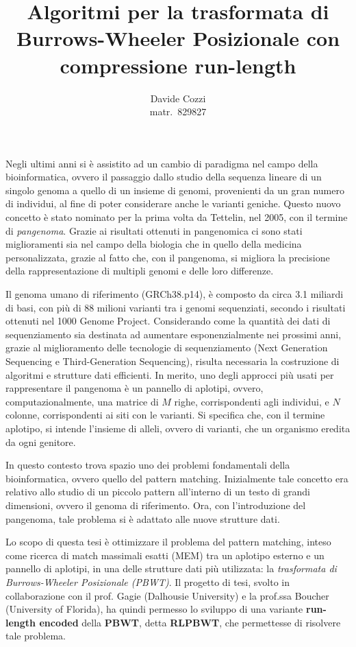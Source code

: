 \documentclass[a4paper,11pt, oneside,italian]{article}
\title{Algoritmi per la trasformata di Burrows-Wheeler
  Posizionale con compressione run-length}
\author{Davide Cozzi\\\smaller matr.~829827}
\date{}
\begin{document}
\maketitle
{}
\noindent
Negli ultimi anni si è assistito ad un cambio di paradigma nel campo della
bioinformatica, ovvero il passaggio dallo studio della sequenza lineare di un
singolo genoma a quello di un insieme di genomi, provenienti da un gran numero
di individui, al fine di poter considerare anche le varianti
  geniche. Questo nuovo concetto è stato nominato per la prima volta da
Tettelin, nel 2005, con il termine di \textit{pangenoma}. Grazie ai risultati
ottenuti in pangenomica ci sono stati miglioramenti sia nel 
campo della biologia che in quello della medicina personalizzata, grazie al
fatto che, con il pangenoma, si migliora la precisione della rappresentazione di
multipli genomi e delle loro differenze. 

Il genoma umano di riferimento (GRCh38.p14), è composto da circa
3.1 miliardi di basi, con più di 88 milioni 
varianti tra i genomi sequenziati, secondo i risultati ottenuti nel 1000 Genome
Project. Considerando come la quantità dei dati di sequenziamento sia destinata
ad aumentare esponenzialmente nei prossimi anni, grazie al
miglioramento delle tecnologie di sequenziamento (Next Generation Sequencing e
Third-Generation Sequencing), risulta necessaria la costruzione di algoritmi e
strutture dati efficienti. 
In merito, uno degli approcci più usati per rappresentare il pangenoma è un
pannello di aplotipi, ovvero, computazionalmente, una matrice di $M$
righe, corrispondenti agli individui, e $N$ colonne, corrispondenti ai siti con
le varianti. Si specifica che, con il termine
aplotipo, si intende l'insieme di alleli, ovvero di varianti, che un organismo
eredita da ogni genitore.

In questo contesto trova spazio uno dei problemi fondamentali della
bioinformatica, ovvero quello del pattern matching. Inizialmente tale concetto
  era relativo allo studio di un piccolo pattern all'interno di un testo di
  grandi dimensioni, ovvero il genoma di riferimento. Ora, con l'introduzione 
del pangenoma, tale problema si è adattato alle nuove strutture
dati.

Lo scopo di questa tesi è ottimizzare il problema del pattern 
matching, inteso come ricerca di match massimali esatti (MEM) tra un aplotipo
esterno e un pannello di aplotipi, in una delle 
strutture dati più utilizzata: la \textit{trasformata di Burrows-Wheeler
  Posizionale (PBWT)}. Il progetto di tesi, svolto in collaborazione con il
prof. Gagie (Dalhousie University) e la prof.ssa Boucher 
(University of Florida), ha quindi permesso lo sviluppo di una variante
\textbf{run-length encoded} della \textbf{PBWT}, detta \textbf{RLPBWT}, che
permettesse di risolvere tale problema.
\end{document}
